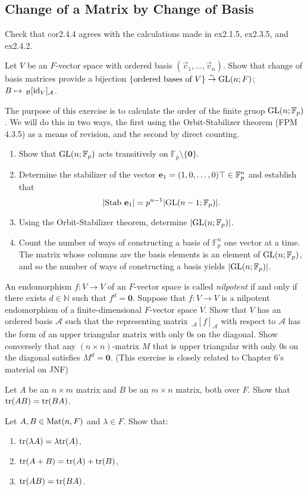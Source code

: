 \subsection{Change of a Matrix by Change of Basis}
\item Check that cor2.4.4 agrees with the calculations made in ex2.1.5, ex2.3.5, and ex2.4.2.
\item Let $V$ be an $F$-vector space with ordered basis $(\vec{v}_1, \dots, \vec{v}_n)$. Show that change of basis matrices provide a bijection $\{\text{ordered bases of } V\} \stackrel{\sim}{\to} \text{GL}(n; F)$; $B \mapsto \,_\mathcal{B}[\text{id}_V]_\mathcal{A}$.
\item The purpose of this exercise is to calculate the order of the finite gruop $\text{GL}(n; \mathbb{F}_p)$. We will do this in two ways, the first using the Orbit-Stabilizer theorem (FPM 4.3.5) as a means of revision, and the second by direct counting.
  \begin{enumerate}
    \item Show that $\text{GL}(n; \mathbb{F}_p)$ acts transitively on $\mathbb{F}_p \setminus \{ \mathbf{0} \}$.
    \item Determine the stabilizer of the vector $\mathbf{e}_1 = (1, 0, \dots, 0)\top \in \mathbb{F}_p^n$ and establish that
      $$
      |\text{Stab }\mathbf{e}_1| = p^{n-1} |\text{GL}(n-1; \mathbb{F}_p)|.
   $$
   \item Using the Orbit-Stabilizer theorem, determine $|\text{GL}(n; \mathbb{F}_p)|$.
   \item Count the number of ways of constructing a basis of $\mathbb{F}_p^n$ one vector at a time. The matrix whose columns are the basis elements is an element of $\text{GL}(n; \mathbb{F}_p)$, and so the number of ways of constructing a basis yields $|\text{GL}(n; \mathbb{F}_p)|$.
  \end{enumerate}

  \item An endomorphism $f : V \to V$ of an $F$-vector space is called \emph{nilpotent} if and only if there exists $d \in \mathbb{N}$ such that $f^d = \mathbf{0}$. Suppose that $f : V \to V$ is a nilpotent endomorphism of a finite-dimensional $F$-vector space $V$. Show that $V$ has an ordered basis $\mathcal{A}$ such that the representing matrix $\,_{\mathcal{A}}[f]_{\mathcal{A}}$ with respect to $\mathcal{A}$ has the form of an upper triangular matrix with only 0s on the diagonal. Show conversely that any $(n \times n)$-matrix $M$ that is upper triangular with only 0s on the diagonal satisfies $M^d = \mathbf{0}$. (This exercise is closely related to Chapter 6's material on JNF)
  \item Let $A$ be an $n \times m$ matrix and $B$ be an $m \times n$ matrix, both over $F$. Show that $\text{tr}(AB) = \text{tr} (BA)$.
  \item Let $A, B \in \text{Mat}(n, F)$  and $\lambda \in F$. Show that:
    \begin{enumerate}
    \item $\text{tr}(\lambda A) = \lambda \text{tr}(A)$,
    \item $\text{tr}(A + B) = \text{tr}(A) + \text{tr}(B)$,
    \item $\text{tr}(AB) = \text{tr}(BA)$.
    \end{enumerate}

